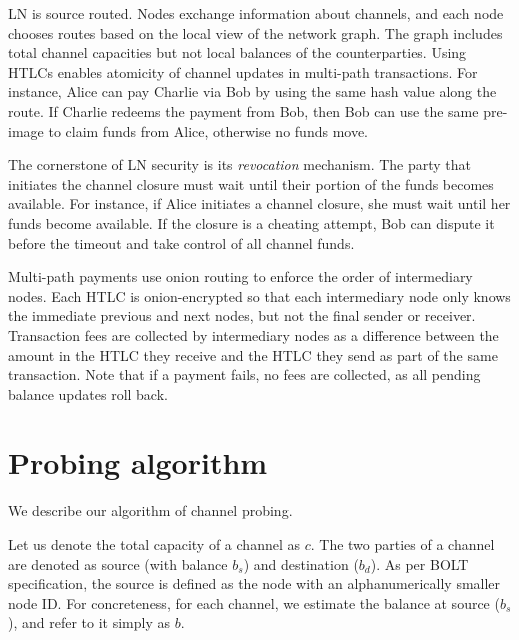 LN is source routed.
Nodes exchange information about channels, and each node chooses routes based on the local view of the network graph.
The graph includes total channel capacities but not local balances of the counterparties.
Using HTLCs enables atomicity of channel updates in multi-path transactions.
For instance, Alice can pay Charlie via Bob by using the same hash value along the route.
If Charlie redeems the payment from Bob, then Bob can use the same pre-image to claim funds from Alice, otherwise no funds move.

The cornerstone of LN security is its \textit{revocation} mechanism.
The party that initiates the channel closure must wait until their portion of the funds becomes available.
For instance, if Alice initiates a channel closure, she must wait until her funds become available.
If the closure is a cheating attempt, Bob can dispute it before the timeout and take control of all channel funds.

Multi-path payments use onion routing to enforce the order of intermediary nodes.
Each HTLC is onion-encrypted so that each intermediary node only knows the immediate previous and next nodes, but not the final sender or receiver.
Transaction fees are collected by intermediary nodes as a difference between the amount in the HTLC they receive and the HTLC they send as part of the same transaction.
Note that if a payment fails, no fees are collected, as all pending balance updates roll back.




\section{Probing algorithm} \label{sec:probing}
We describe our algorithm of channel probing.

Let us denote the total capacity of a channel as $c$.
The two parties of a channel are denoted as source (with balance $b_s$) and destination ($b_d$).
As per BOLT specification, the source is defined as the node with an alphanumerically smaller node ID.
For concreteness, for each channel, we estimate the balance at source ($b_s$), and refer to it simply as $b$.

